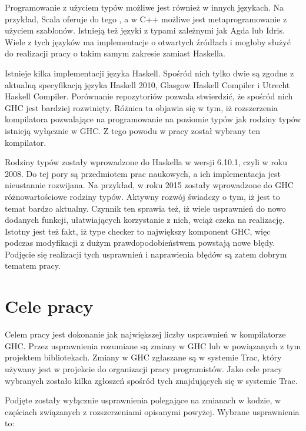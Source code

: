 Programowanie z użyciem typów możliwe jest również w innych językach. Na przykład,
Scala oferuje do tego , a w C++ możliwe jest
metaprogramowanie z użyciem szablonów. Istnieją też języki z typami zależnymi
jak Agda lub Idris. Wiele z tych języków ma implementacje o otwartych źródłach i
mogłoby służyć do realizacji pracy o takim samym zakresie zamiast Haskella.

Istnieje kilka implementacji języka Haskell. Spośród nich tylko dwie są zgodne z
aktualną specyfikacją języka Haskell 2010, Glasgow Haskell Compiler i Utrecht
Haskell Compiler\cite{WikiImplementations}. Porównanie repozytoriów pozwala
stwierdzić, że spośród nich GHC jest bardziej rozwinięty. Różnica ta objawia się
w tym, iż rozszerzenia kompilatora pozwalające na programowanie na poziomie
typów jak rodziny typów istnieją wyłącznie w GHC\cite{UHCUserGuide}. Z tego
powodu w pracy został wybrany ten kompilator.

Rodziny typów zostały wprowadzone do Haskella w wersji 6.10.1, czyli w roku
2008\cite{WikiIndexedTypes}. Do tej pory są przedmiotem prac naukowych, a ich implementacja jest
nieustannie rozwijana. Na przykład, w roku 2015 zostały wprowadzone do GHC
różnowartościowe rodziny typów. Aktywny rozwój świadczy o tym, iż jest to
temat bardzo aktualny. Czynnik ten sprawia też, iż wiele usprawnień do
nowo dodanych funkcji, ułatwiających korzystanie z nich, wciąż czeka na realizację.
Istotny jest też fakt, iż type checker to największy komponent GHC\cite{AOSA},
więc podczas modyfikacji z dużym prawdopodobieństwem powstają nowe błędy.
Podjęcie się realizacji tych usprawnień i naprawienia błędów są zatem dobrym tematem pracy.

\section{Cele pracy}\label{sec:cele_pracy}

Celem pracy jest dokonanie jak największej liczby usprawnień w kompilatorze
GHC. Przez usprawnienia rozumiane są zmiany w GHC lub w powiązanych z tym
projektem bibliotekach. Zmiany w GHC zgłaszane są w systemie Trac, który
używany jest w projekcie do organizacji pracy programistów. Jako cele pracy
wybranych zostało kilka zgłoszeń spośród tych znajdujących się w systemie Trac.

Podjęte zostały wyłącznie usprawnienia polegające na zmianach w
kodzie, w częściach związanych z rozszerzeniami opisanymi powyżej. Wybrane
usprawnienia to:

